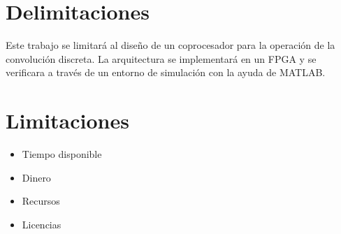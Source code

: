 \section{Delimitaciones}
Este trabajo se limitará al diseño de un coprocesador para la operación de la convolución discreta. La arquitectura se implementará en un FPGA y se verificara a través de un entorno de simulación con la ayuda de MATLAB.

\section{Limitaciones}
\begin{itemize}
Las principales limitaciones del proyecto son: 
\item Tiempo disponible
\item Dinero
\item Recursos
\item Licencias
\end{itemize}
